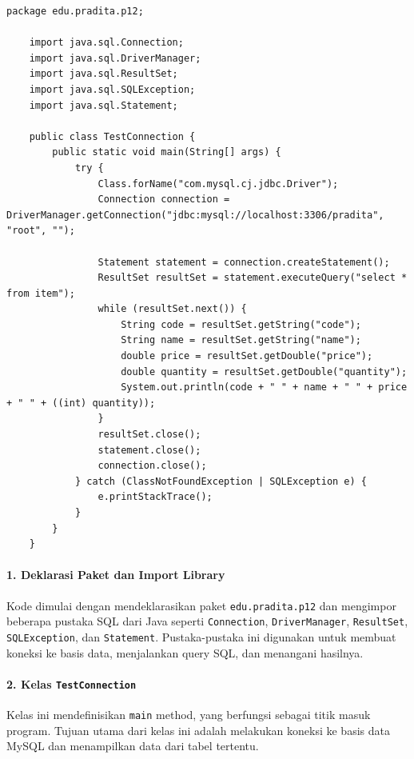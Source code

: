 \begin{lstlisting}[style=JavaStyle]
	package edu.pradita.p12;
	
	import java.sql.Connection;
	import java.sql.DriverManager;
	import java.sql.ResultSet;
	import java.sql.SQLException;
	import java.sql.Statement;
	
	public class TestConnection {
		public static void main(String[] args) {
			try {
				Class.forName("com.mysql.cj.jdbc.Driver");
				Connection connection = DriverManager.getConnection("jdbc:mysql://localhost:3306/pradita", "root", "");
				
				Statement statement = connection.createStatement();
				ResultSet resultSet = statement.executeQuery("select * from item");
				while (resultSet.next()) {
					String code = resultSet.getString("code");
					String name = resultSet.getString("name");
					double price = resultSet.getDouble("price");
					double quantity = resultSet.getDouble("quantity");
					System.out.println(code + " " + name + " " + price + " " + ((int) quantity));
				}
				resultSet.close();
				statement.close();
				connection.close();
			} catch (ClassNotFoundException | SQLException e) {
				e.printStackTrace();
			}
		}
	}
\end{lstlisting}

\paragraph{1. Deklarasi Paket dan Import Library}
Kode dimulai dengan mendeklarasikan paket \texttt{edu.pradita.p12} dan mengimpor beberapa pustaka SQL dari Java seperti \texttt{Connection}, \texttt{DriverManager}, \texttt{ResultSet}, \texttt{SQLException}, dan \texttt{Statement}. Pustaka-pustaka ini digunakan untuk membuat koneksi ke basis data, menjalankan query SQL, dan menangani hasilnya.

\paragraph{2. Kelas \texttt{TestConnection}}
Kelas ini mendefinisikan \texttt{main} method, yang berfungsi sebagai titik masuk program. Tujuan utama dari kelas ini adalah melakukan koneksi ke basis data MySQL dan menampilkan data dari tabel tertentu.

